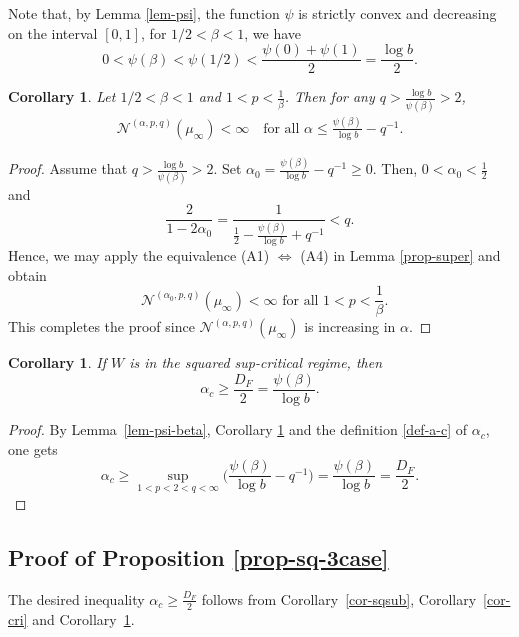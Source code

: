 \documentclass[12pt]{amsart}
\newtheorem{corollary}[theorem]{Corollary}
\theoremstyle{definition}
\theoremstyle{remark}
\numberwithin{equation}{section}
\begin{document}
Note that,  by Lemma \ref{lem-psi}, the function $\psi$ is strictly convex and decreasing  on the interval $[0,1]$,  for $1/2 < \beta <1$, we have 
\[
0< \psi(\beta) < \psi(1/2) < \frac{\psi(0)+\psi(1)}{2}=\frac{\log b}{2} .
\]

\begin{corollary}\label{cor-super-alpha}
Let $1/2 < \beta <1$ and $1<p<\frac{1}{\beta}$. Then  for any $q>  \frac{\log b}{\psi(\beta)}>2$, 
\begin{align*}
\mathcal{N}^{(\alpha, p, q)}(\mu_\infty)<\infty \quad \text{for all 
 $\alpha\le \frac{\psi(\beta)}{\log b} - q^{-1}$}.
 \end{align*}
\end{corollary}

\begin{proof}
Assume that $q>  \frac{\log b}{\psi(\beta)}>2$.  Set $\alpha_0 = \frac{\psi(\beta)}{\log b} - q^{-1}\ge 0$. 
Then,  $0< \alpha_0<\frac{1}{2}$ and 
\[
 \frac{2}{1-2\alpha_0} = \frac{1}{\frac{1}{2}-  \frac{\psi(\beta)}{\log b}  + q^{-1}} < q. 
\] 
Hence, we may apply the equivalence  (A1) $\Longleftrightarrow$ (A4) in Lemma \ref{prop-super}  and obtain 
\[
\text{ $\mathcal{N}^{(\alpha_0, p, q)}(\mu_\infty)<\infty$ for all $1< p< \frac{1}{\beta}$.} 
\]
 This completes the proof since $\mathcal{N}^{(\alpha, p, q)}(\mu_\infty)$ is increasing in $\alpha$. 
\end{proof}
\begin{corollary}\label{cor-sqsup}
If  $W$ is in the squared sup-critical regime, then 
\[
\alpha_c\geq  \frac{D_F}{2}=\frac{\psi(\beta)}{\log b}.
\]
\end{corollary}
\begin{proof}
 By Lemma~\ref{lem-psi-beta}, Corollary \ref{cor-super-alpha}  and the definition \eqref{def-a-c} of $\alpha_c$, one gets
	\[
	\alpha_c \ge  \sup_{1< p< 2< q<\infty}  \Big(\frac{\psi(\beta)}{\log b} - q^{-1}\Big)=  \frac{\psi(\beta)}{\log b}=\frac{D_F}{2}.
	\]

\end{proof}


\subsection{Proof of Proposition \ref{prop-sq-3case}}

The desired inequality 
$
\alpha_c\ge \frac{D_F}{2}
$
 follows from 
Corollary~\ref{cor-sqsub}, Corollary~\ref{cor-cri} and Corollary~\ref{cor-sqsup}. 
\end{document}
